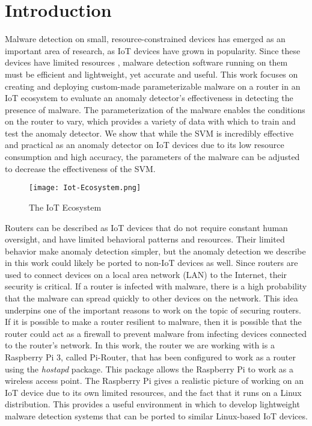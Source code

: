 \documentclass[runningheads]{llncs}
\begin{document}
\section{Introduction}
Malware detection on small, resource-constrained devices has emerged as an important area of research, as IoT devices have grown in popularity. Since these devices have limited resources \cite{10.1145/3139937.3139944}, malware detection software running on them must be efficient and lightweight, yet accurate and useful. This work focuses on creating and deploying custom-made parameterizable malware on a router in an IoT ecosystem to evaluate an anomaly detector's effectiveness in detecting the presence of malware. The parameterization of the malware enables the conditions on the router to vary, which provides a variety of data with which to train and test the anomaly detector. We show that while the SVM is incredibly effective and practical as an anomaly detector on IoT devices due to its low resource consumption and high accuracy, the parameters of the malware can be adjusted to decrease the effectiveness of the SVM.

\begin{figure}
    \centering
    \texttt{[image: Iot-Ecosystem.png]}
    \caption{The IoT Ecosystem\label{fig:ecosystem}}
\end{figure}

\indent Routers can be described as IoT devices that do not require constant human oversight, and have limited behavioral patterns and resources. Their limited behavior make anomaly detection simpler, but the anomaly detection we describe in this work could likely be ported to non-IoT devices as well. Since routers are used to connect devices on a local area network (LAN) to the Internet, their security is critical. If a router is infected with malware, there is a high probability that the malware can spread quickly to other devices on the network. This idea underpins one of the important reasons to work on the topic of securing routers. If it is possible to make a router resilient to malware, then it is possible that the router could act as a firewall to prevent malware from infecting devices connected to the router's network. In this work, the router we are working with is a Raspberry Pi 3, called Pi-Router, that has been configured to work as a router using the \textit{hostapd} package. This package allows the Raspberry Pi to work as a wireless access point. The Raspberry Pi gives a realistic picture of working on an IoT device due to its own limited resources, and the fact that it runs on a Linux distribution. This provides a useful environment in which to develop lightweight malware detection systems that can be ported to similar Linux-based IoT devices.
\end{document}
